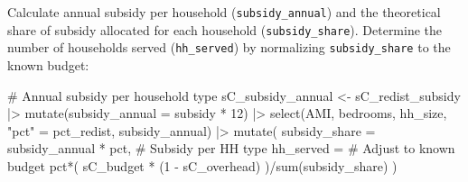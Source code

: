 \documentclass[
  10pt,
  letterpaper,
  DIV=11,
  numbers=noendperiod]{scrartcl}
\newenvironment{Shaded}{\begin{snugshade}}{\end{snugshade}}
\newcommand{\AttributeTok}[1]{\textcolor[rgb]{0.40,0.45,0.13}{#1}}
\newcommand{\CommentTok}[1]{\textcolor[rgb]{0.37,0.37,0.37}{#1}}
\newcommand{\DecValTok}[1]{\textcolor[rgb]{0.68,0.00,0.00}{#1}}
\newcommand{\FunctionTok}[1]{\textcolor[rgb]{0.28,0.35,0.67}{#1}}
\newcommand{\NormalTok}[1]{\textcolor[rgb]{0.00,0.23,0.31}{#1}}
\newcommand{\OtherTok}[1]{\textcolor[rgb]{0.00,0.23,0.31}{#1}}
\newcommand{\SpecialCharTok}[1]{\textcolor[rgb]{0.37,0.37,0.37}{#1}}
\newcommand{\StringTok}[1]{\textcolor[rgb]{0.13,0.47,0.30}{#1}}
\begin{document}
Calculate annual subsidy per household (\texttt{subsidy\_annual}) and
the theoretical share of subsidy allocated for each household
(\texttt{subsidy\_share}). Determine the number of households served
(\texttt{hh\_served}) by normalizing \texttt{subsidy\_share} to the
known budget:

\begin{Shaded}
\begin{Highlighting}[]
\CommentTok{\# Annual subsidy per household type}
\NormalTok{sC\_subsidy\_annual }\OtherTok{\textless{}{-}}\NormalTok{ sC\_redist\_subsidy }\SpecialCharTok{|\textgreater{}}
  \FunctionTok{mutate}\NormalTok{(}\AttributeTok{subsidy\_annual =}\NormalTok{ subsidy }\SpecialCharTok{*} \DecValTok{12}\NormalTok{) }\SpecialCharTok{|\textgreater{}} 
  \FunctionTok{select}\NormalTok{(AMI, bedrooms, hh\_size, }\StringTok{"pct"} \OtherTok{=}\NormalTok{ pct\_redist, subsidy\_annual) }\SpecialCharTok{|\textgreater{}} 
  \FunctionTok{mutate}\NormalTok{(}
    \AttributeTok{subsidy\_share =}\NormalTok{ subsidy\_annual }\SpecialCharTok{*}\NormalTok{ pct, }\CommentTok{\# Subsidy per HH type}
    \AttributeTok{hh\_served =} \CommentTok{\# Adjust to known budget}
\NormalTok{      pct}\SpecialCharTok{*}\NormalTok{(}
\NormalTok{        sC\_budget }\SpecialCharTok{*}\NormalTok{ (}\DecValTok{1} \SpecialCharTok{{-}}\NormalTok{ sC\_overhead)}
\NormalTok{        )}\SpecialCharTok{/}\FunctionTok{sum}\NormalTok{(subsidy\_share) }
\NormalTok{  )}
\end{Highlighting}
\end{Shaded}

\begingroup\fontsize{8}{10}\selectfont
\end{document}
